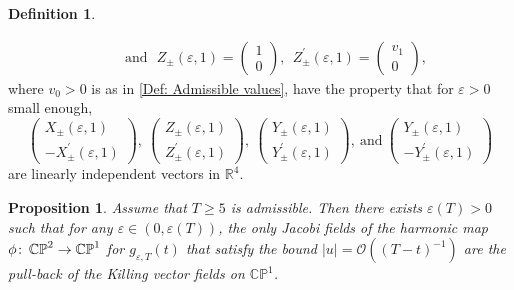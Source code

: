 \documentclass{article}
\numberwithin{equation}{section}        %
\theoremstyle{bfnote}
\newtheorem{prop}[thm]{Proposition}         %
\theoremstyle{definition}
\newtheorem{Def}[thm]{Definition}           %
\theoremstyle{bfremark}
\newcommand{\col}{\colon \thinspace}        %
\newcommand{\R}{\mathbb{R}}                 %
\begin{document}
\begin{Def}
\begin{enumerate}
\begin{align*}
                & ~~~~~~~  \text{and} ~~~ Z_\pm(\varepsilon,1) =
                \begin{pmatrix}
                    1 \\
                    0
                \end{pmatrix}, ~~Z^\prime_\pm(\varepsilon,1) =
                \begin{pmatrix}
                    v_1 \\
                    0
                \end{pmatrix} ,
            \end{align*}
            where $v_0 > 0$ is as in \cref{Def: Admissible values}, have the property that for $\varepsilon > 0$ small enough, 
            \begin{equation*}
                \begin{pmatrix}
                    X_\pm(\varepsilon,1) \\
                    - X_\pm^\prime(\varepsilon,1)
                \end{pmatrix}, ~
                \begin{pmatrix}
                    Z_\pm(\varepsilon,1) \\
                    Z_\pm^\prime(\varepsilon,1)
                \end{pmatrix}, ~
                \begin{pmatrix}
                    Y_\pm(\varepsilon,1) \\
                    Y_\pm^\prime(\varepsilon,1)
                \end{pmatrix}, ~ \text{and} ~
                \begin{pmatrix}
                    Y_\pm(\varepsilon,1) \\
                    - Y_\pm^\prime(\varepsilon,1)
                \end{pmatrix}
            \end{equation*}
            are linearly independent vectors in $\R^4$.
    \end{enumerate}
\end{Def}

\begin{prop}
    Assume that $T\geq 5$ is admissible. Then there exists $\varepsilon(T)>0$ such that for any $\varepsilon \in (0,\varepsilon(T))$, the only Jacobi fields of the harmonic map $\phi \col \mathbb{CP}^2 \to \mathbb{CP}^1$ for $g_{\varepsilon,T}(t)$ that satisfy the bound $\vert u \vert= \mathcal{O}((T-t)^{-1})$ are the pull-back of the Killing vector fields on $\mathbb{CP}^1$.
\end{prop}
\end{document}
